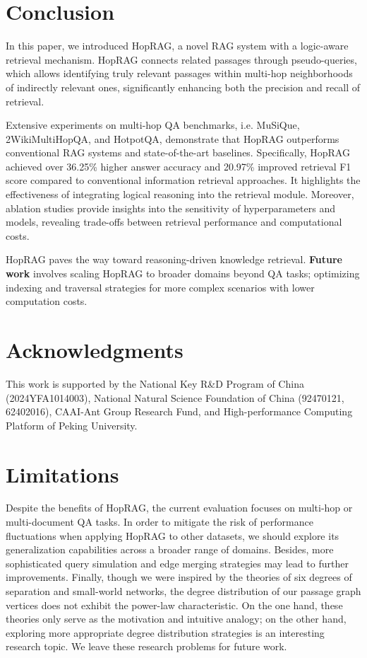 \section{Conclusion}
\label{sec:conclusion}
In this paper, we introduced HopRAG, a novel RAG system with a logic-aware retrieval mechanism. HopRAG connects related passages through pseudo-queries, which allows identifying truly relevant passages within multi-hop neighborhoods of indirectly relevant ones, significantly enhancing both the precision and recall of retrieval.

Extensive experiments on multi-hop QA benchmarks, i.e. MuSiQue, 2WikiMultiHopQA, and HotpotQA, demonstrate that HopRAG outperforms conventional RAG systems and state-of-the-art baselines. Specifically, HopRAG achieved over 36.25\% higher answer accuracy and 20.97\% improved retrieval F1 score compared to conventional information retrieval approaches. It highlights the effectiveness of integrating logical reasoning into the retrieval module. Moreover, ablation studies provide insights into the sensitivity of hyperparameters and models, revealing trade-offs between retrieval performance and computational costs. 

HopRAG paves the way toward reasoning-driven knowledge retrieval. \textbf{Future work} involves scaling HopRAG to broader domains beyond QA tasks; optimizing indexing and traversal strategies for more complex scenarios with lower computation costs.

\section*{Acknowledgments}
This work is supported by the National Key R\&D Program of China (2024YFA1014003), National Natural Science Foundation of China (92470121, 62402016), CAAI-Ant Group Research Fund, and High-performance Computing Platform of Peking University.

\section*{Limitations}
Despite the benefits of HopRAG, the current evaluation focuses on multi-hop or multi-document QA tasks. In order to mitigate the risk of performance fluctuations when applying HopRAG to other datasets, we should explore its generalization capabilities across a broader range of domains. Besides, more sophisticated query simulation and edge merging strategies may lead to further improvements. Finally, though we were inspired by the theories of six degrees of separation and small-world networks, the degree distribution of our passage graph vertices does not exhibit the power-law characteristic. On the one hand, these theories only serve as the motivation and intuitive analogy; on the other hand, exploring more appropriate degree distribution strategies is an interesting research topic. We leave these research problems for future work.


